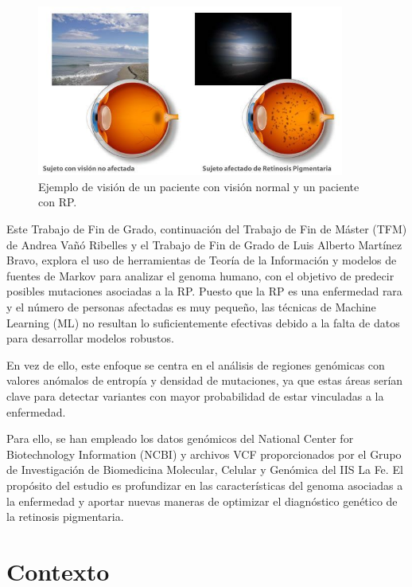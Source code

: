 \documentclass[11pt,spanish,listoffigures,listoftables]{tfgetsinf}
\begin{document}
\begin{figure}[H]
   \centering
   \includegraphics[width=0.9\textwidth]{Retinosis-Pigmetaria.jpg}
   \caption{Ejemplo de visión de un paciente con visión normal y un paciente con \acs{RP}.}
   \label{fig:etiqueta_opcional2}
\end{figure}

Este Trabajo de Fin de Grado, continuación del Trabajo de Fin de Máster (\acs{TFM}) de Andrea Vañó Ribelles\cite{VAN} y el Trabajo de Fin de Grado de Luis Alberto Martínez Bravo\cite{MAR}, explora el uso de herramientas de Teoría de la Información y modelos de fuentes de Markov para analizar el genoma humano, con el objetivo de predecir posibles mutaciones asociadas a la \acs{RP}. Puesto que la \acs{RP} es una enfermedad rara y el número de personas afectadas es muy pequeño, las técnicas de Machine Learning (\acs{ML}) no resultan lo suficientemente efectivas debido a la falta de datos para desarrollar modelos robustos. 

 

En vez de ello, este enfoque se centra en el análisis de regiones genómicas con valores anómalos de entropía y densidad de mutaciones, ya que estas áreas serían clave para detectar variantes con mayor probabilidad de estar vinculadas a la enfermedad. 

 

Para ello, se han empleado los datos genómicos del National Center for Biotechnology Information (\acs{NCBI}) y archivos \acs{VCF} proporcionados por el Grupo de Investigación de Biomedicina Molecular, Celular y Genómica del \acs{IIS} La Fe. El propósito del estudio es profundizar en las características del genoma asociadas a la enfermedad y aportar nuevas maneras de optimizar el diagnóstico genético de la retinosis pigmentaria. 

\section{Contexto}
\end{document}
